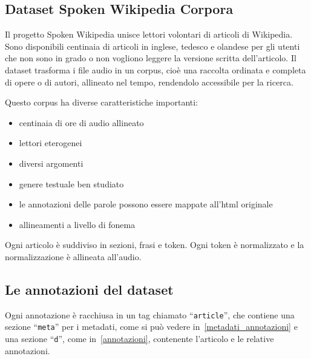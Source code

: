\documentclass[12pt,a4paper,titlepage]{article}
\begin{document}
\subsection{Dataset Spoken Wikipedia Corpora}
\label{subsec:spoken_wikipedia_corpora}
Il progetto Spoken Wikipedia unisce lettori volontari di articoli di Wikipedia. Sono disponibili centinaia di articoli in inglese, tedesco e olandese per gli utenti che non sono in grado o non vogliono leggere la versione scritta dell'articolo. Il dataset trasforma i file audio in un corpus, cioè una raccolta ordinata e completa di opere o di autori, allineato nel tempo, rendendolo accessibile per la ricerca.\cite{minining_spoken_wikipedia}

Questo corpus ha diverse caratteristiche importanti:
\begin{itemize}
	\item centinaia di ore di audio allineato
	\item lettori eterogenei
	\item diversi argomenti
	\item genere testuale ben studiato
	\item le annotazioni delle parole possono essere mappate all'html originale
	\item allineamenti a livello di fonema
\end{itemize}

Ogni articolo è suddiviso in sezioni, frasi e token. Ogni token è normalizzato e la normalizzazione è allineata all'audio.

\subsection{Le annotazioni del dataset}
\label{subsec:annotazioni}
Ogni annotazione è racchiusa in un tag chiamato ``\texttt{article}'', che contiene una sezione ``\texttt{meta}'' per i metadati, come si può vedere in~\ref{metadati_annotazioni} e una sezione ``\texttt{d}'', come in~\ref{annotazioni}, contenente l'articolo e le relative annotazioni.
\end{document}

